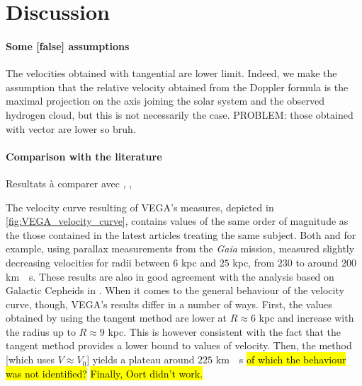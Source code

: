 \section{Discussion}
\paragraph{Some [false] assumptions}
The velocities obtained with tangential are lower limit.
Indeed, we make the assumption that the relative velocity obtained from the Doppler formula is the maximal projection on the axis joining the solar system and the observed hydrogen cloud, but this is not necessarily the case.
PROBLEM: those obtained with vector are lower so bruh.

\paragraph{Comparison with the literature}
Resultats à comparer avec \cite{ou_dark_2024}, \cite{jia_research_2022}, \cite{mroz_rotation_2019}

The velocity curve resulting of VEGA's measures, depicted in \autoref{fig:VEGA_velocity_curve}, contains values of the same order of magnitude as the those contained in the latest articles treating the same subject.
Both \cite{ou_dark_2024} and \cite{eilers_circular_2019} for example, using parallax measurements from the \emph{Gaia} mission, measured slightly decreasing velocities for radii between $6$ kpc and $25$ kpc, from $230$ to around $200$ \unit{km \per s}.
These results are also in good agreement with the analysis based on Galactic Cepheids in \cite{mroz_rotation_2019}.
When it comes to the general behaviour of the velocity curve, though, VEGA's results differ in a number of ways.
First, the values obtained by using the tangent method are lower at $R \approx 6$ kpc and increase with the radius up to $R \approx 9$ kpc.
This is however consistent with the fact that the tangent method provides a lower bound to values of velocity.
Then, the method [which uses $V \approx V_0$] yields a plateau around $225$ \unit{km \per s} \hl{of which the behaviour was not identified?}
\hl{Finally, Oort didn't work.}

